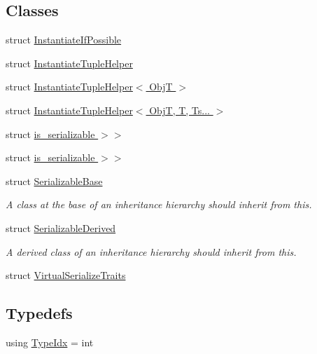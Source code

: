 \subsection*{Classes}
\begin{DoxyCompactItemize}
\item 
struct \hyperlink{structcheckpoint_1_1dispatch_1_1vrt_1_1_instantiate_if_possible}{Instantiate\+If\+Possible}
\item 
struct \hyperlink{structcheckpoint_1_1dispatch_1_1vrt_1_1_instantiate_tuple_helper}{Instantiate\+Tuple\+Helper}
\item 
struct \hyperlink{structcheckpoint_1_1dispatch_1_1vrt_1_1_instantiate_tuple_helper_3_01_obj_t_01_4}{Instantiate\+Tuple\+Helper$<$ Obj\+T $>$}
\item 
struct \hyperlink{structcheckpoint_1_1dispatch_1_1vrt_1_1_instantiate_tuple_helper_3_01_obj_t_00_01_t_00_01_ts_8_8_8_01_4}{Instantiate\+Tuple\+Helper$<$ Obj\+T, T, Ts... $>$}
\item 
struct \hyperlink{structcheckpoint_1_1dispatch_1_1vrt_1_1_instantiate_if_possible_3_01_obj_t_00_01_serializer_t_00f2328765646be8355fd88552c7d20478}{is\+\_\+serializable $>$$>$}
\item 
struct \hyperlink{structcheckpoint_1_1dispatch_1_1vrt_1_1_instantiate_if_possible_3_01_obj_t_00_01_serializer_t_00e6cea7afc6d3212786593c9e3a69da69}{is\+\_\+serializable $>$$>$}
\item 
struct \hyperlink{structcheckpoint_1_1dispatch_1_1vrt_1_1_serializable_base}{Serializable\+Base}
\begin{DoxyCompactList}\small\item\em A class at the base of an inheritance hierarchy should inherit from this. \end{DoxyCompactList}\item 
struct \hyperlink{structcheckpoint_1_1dispatch_1_1vrt_1_1_serializable_derived}{Serializable\+Derived}
\begin{DoxyCompactList}\small\item\em A derived class of an inheritance hierarchy should inherit from this. \end{DoxyCompactList}\item 
struct \hyperlink{structcheckpoint_1_1dispatch_1_1vrt_1_1_virtual_serialize_traits}{Virtual\+Serialize\+Traits}
\end{DoxyCompactItemize}
\subsection*{Typedefs}
\begin{DoxyCompactItemize}
\item 
using \hyperlink{namespacecheckpoint_1_1dispatch_1_1vrt_acd3f9e6b091bcfbc23dc35ea8ef45d3b}{Type\+Idx} = int
\end{DoxyCompactItemize}
